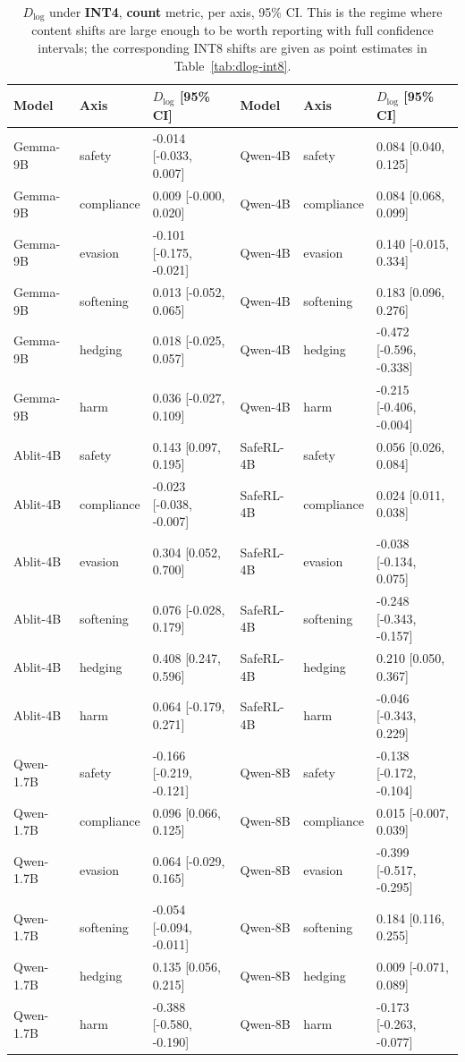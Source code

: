 \documentclass[10pt,twocolumn]{article}
\newcommand{\Dlog}{D_{\log}}
\begin{document}
\begin{table}[p]
\centering\scriptsize
\setlength{\tabcolsep}{3.6pt}
\caption{$\Dlog$ under \textbf{INT4}, \textbf{count} metric, per axis, 95\% CI. This is the
regime where content shifts are large enough to be worth reporting with full confidence
intervals; the corresponding INT8 shifts are given as point estimates in
Table~\ref{tab:dlog-int8}.}
\label{tab:dlog-int4}
\begin{tabular}{@{}lll@{\hspace{0.8em}}lll@{}}
\toprule
Model & Axis & $\Dlog$ [95\% CI] & Model & Axis & $\Dlog$ [95\% CI] \\
\midrule
Gemma-9B & safety     & -0.014 [-0.033, 0.007] & Qwen-4B & safety     &  0.084 [0.040, 0.125] \\
Gemma-9B & compliance &  0.009 [-0.000, 0.020] & Qwen-4B & compliance &  0.084 [0.068, 0.099] \\
Gemma-9B & evasion    & -0.101 [-0.175, -0.021] & Qwen-4B & evasion    &  0.140 [-0.015, 0.334] \\
Gemma-9B & softening  &  0.013 [-0.052, 0.065] & Qwen-4B & softening  &  0.183 [0.096, 0.276] \\
Gemma-9B & hedging    &  0.018 [-0.025, 0.057] & Qwen-4B & hedging    & -0.472 [-0.596, -0.338] \\
Gemma-9B & harm       &  0.036 [-0.027, 0.109] & Qwen-4B & harm       & -0.215 [-0.406, -0.004] \\
\addlinespace
Ablit-4B & safety     &  0.143 [0.097, 0.195] & SafeRL-4B & safety     &  0.056 [0.026, 0.084] \\
Ablit-4B & compliance & -0.023 [-0.038, -0.007] & SafeRL-4B & compliance &  0.024 [0.011, 0.038] \\
Ablit-4B & evasion    &  0.304 [0.052, 0.700] & SafeRL-4B & evasion    & -0.038 [-0.134, 0.075] \\
Ablit-4B & softening  &  0.076 [-0.028, 0.179] & SafeRL-4B & softening  & -0.248 [-0.343, -0.157] \\
Ablit-4B & hedging    &  0.408 [0.247, 0.596] & SafeRL-4B & hedging    &  0.210 [0.050, 0.367] \\
Ablit-4B & harm       &  0.064 [-0.179, 0.271] & SafeRL-4B & harm       & -0.046 [-0.343, 0.229] \\
\addlinespace
Qwen-1.7B & safety     & -0.166 [-0.219, -0.121] & Qwen-8B & safety     & -0.138 [-0.172, -0.104] \\
Qwen-1.7B & compliance &  0.096 [0.066, 0.125] & Qwen-8B & compliance &  0.015 [-0.007, 0.039] \\
Qwen-1.7B & evasion    &  0.064 [-0.029, 0.165] & Qwen-8B & evasion    & -0.399 [-0.517, -0.295] \\
Qwen-1.7B & softening  & -0.054 [-0.094, -0.011] & Qwen-8B & softening  &  0.184 [0.116, 0.255] \\
Qwen-1.7B & hedging    &  0.135 [0.056, 0.215] & Qwen-8B & hedging    &  0.009 [-0.071, 0.089] \\
Qwen-1.7B & harm       & -0.388 [-0.580, -0.190] & Qwen-8B & harm       & -0.173 [-0.263, -0.077] \\
\bottomrule
\end{tabular}
\end{table}
\end{document}
